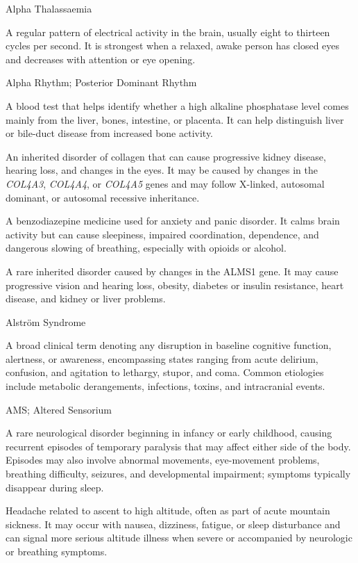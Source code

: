 \synonyms
Alpha Thalassaemia

 A regular pattern of electrical activity in the brain, usually eight to thirteen cycles per second. It is strongest when a relaxed, awake person has closed eyes and decreases with attention or eye opening.

\synonyms
Alpha Rhythm; Posterior Dominant Rhythm

 A blood test that helps identify whether a high alkaline phosphatase level comes mainly from the liver, bones, intestine, or placenta. It can help distinguish liver or bile-duct disease from increased bone activity.

 An inherited disorder of collagen that can cause progressive kidney disease, hearing loss, and changes in the eyes. It may be caused by changes in the \textit{COL4A3}, \textit{COL4A4}, or \textit{COL4A5} genes and may follow X-linked, autosomal dominant, or autosomal recessive inheritance.

 A benzodiazepine medicine used for anxiety and panic disorder. It calms brain activity but can cause sleepiness, impaired coordination, dependence, and dangerous slowing of breathing, especially with opioids or alcohol.

 A rare inherited disorder caused by changes in the ALMS1 gene. It may cause progressive vision and hearing loss, obesity, diabetes or insulin resistance, heart disease, and kidney or liver problems.

\synonyms
Alström Syndrome

 A broad clinical term denoting any disruption in baseline cognitive function, alertness, or awareness, encompassing states ranging from acute delirium, confusion, and agitation to lethargy, stupor, and coma. Common etiologies include metabolic derangements, infections, toxins, and intracranial events.

\synonyms
AMS; Altered Sensorium

 A rare neurological disorder beginning in infancy or early childhood, causing recurrent episodes of temporary paralysis that may affect either side of the body. Episodes may also involve abnormal movements, eye-movement problems, breathing difficulty, seizures, and developmental impairment; symptoms typically disappear during sleep.

 Headache related to ascent to high altitude, often as part of acute mountain sickness. It may occur with nausea, dizziness, fatigue, or sleep disturbance and can signal more serious altitude illness when severe or accompanied by neurologic or breathing symptoms.

